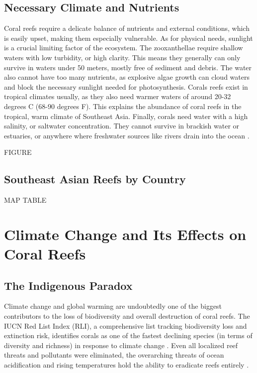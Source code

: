 \documentclass{book}\usepackage{knitr}
\begin{document}
\begin{knitrout}
\begin{kframe}
\subsection{Necessary Climate and Nutrients}

Coral reefs require a delicate balance of nutrients and external conditions, which is easily upset, making them especially vulnerable. As for physical needs, sunlight is a crucial limiting factor of the ecosystem. The zooxanthellae require shallow waters with low turbidity, or high clarity. This means they generally can only survive in waters under 50 meters, mostly free of sediment and debris. The water also cannot have too many nutrients, as explosive algae growth can cloud waters and block the necessary sunlight needed for photosynthesis. Corals reefs exist in tropical climates usually, as they also need warmer waters of around 20-32 degrees C (68-90 degrees F). This explains the abundance of coral reefs in the tropical, warm climate of Southeast Asia. Finally, corals need water with a high salinity, or saltwater concentration. They cannot survive in brackish water or estuaries, or anywhere where freshwater sources like rivers drain into the ocean \citep{https://doi.org/10.1002/fee.2088}.

FIGURE

\subsection{Southeast Asian Reefs by Country}

MAP
TABLE

\section{Climate Change and Its Effects on Coral Reefs}

\subsection{The Indigenous Paradox}

Climate change and global warming are undoubtedly one of the biggest contributors to the loss of biodiversity and overall destruction of coral reefs. The IUCN Red List Index (RLI), a comprehensive list tracking biodiversity loss and extinction risk, identifies corals as one of the fastest declining species (in terms of diversity and richness) in response to climate change \citep{wwfindex}. Even all localized reef threats and pollutants were eliminated, the overarching threats of ocean acidification and rising temperatures hold the ability to eradicate reefs entirely \citep{Keller2009ClimateCC}.


\end{kframe}
\end{knitrout}
\end{document}
